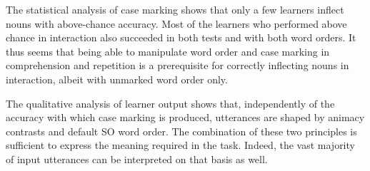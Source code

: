 The statistical analysis of case marking shows that only a few learners inflect nouns with above-chance accuracy. Most of the learners who performed above chance in interaction also succeeded in both tests and with both word orders. It thus seems that being able to manipulate word order and case marking in comprehension and repetition is a prerequisite for correctly inflecting nouns in interaction, albeit with unmarked word order only.

The qualitative analysis of learner output shows that, independently of the accuracy with which case marking is produced, utterances are shaped by animacy contrasts and default SO word order. The combination of these two principles is sufficient to express the meaning required in the task. Indeed, the vast majority of input utterances can be interpreted on that basis as well.
